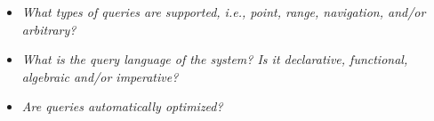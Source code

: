 
\begin{itemize}
\item \emph{What types of queries are supported, i.e., point, range, navigation, and/or arbitrary?}
\item \emph{What is the query language of the system? Is it declarative, functional, algebraic and/or imperative?}
\item \emph{Are queries automatically optimized?}
\end{itemize}